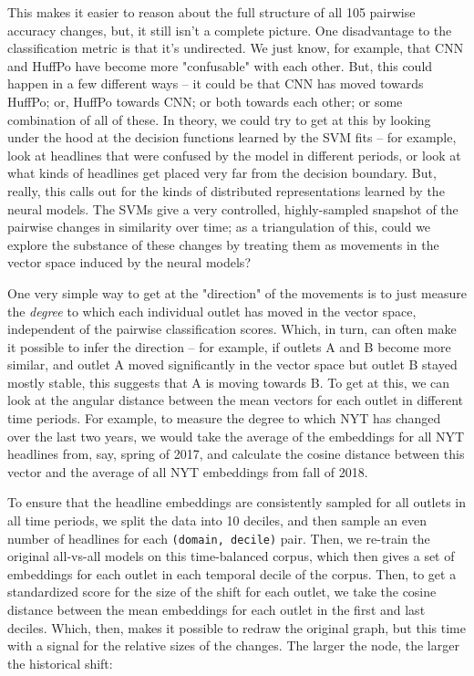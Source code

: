 \documentclass{scrartcl}
\begin{document}
This makes it easier to reason about the full structure of all 105 pairwise accuracy changes, but, it still isn't a complete picture. One disadvantage to the classification metric is that it's undirected. We just know, for example, that CNN and HuffPo have become more "confusable" with each other. But, this could happen in a few different ways -- it could be that CNN has moved towards HuffPo; or, HuffPo towards CNN; or both towards each other; or some combination of all of these. In theory, we could try to get at this by looking under the hood at the decision functions learned by the SVM fits -- for example, look at headlines that were confused by the model in different periods, or look at what kinds of headlines get placed very far from the decision boundary. But, really, this calls out for the kinds of distributed representations learned by the neural models. The SVMs give a very controlled, highly-sampled snapshot of the pairwise changes in similarity over time; as a triangulation of this, could we explore the substance of these changes by treating them as movements in the vector space induced by the neural models?

One very simple way to get at the "direction" of the movements is to just measure the \textit{degree} to which each individual outlet has moved in the vector space, independent of the pairwise classification scores. Which, in turn, can often make it possible to infer the direction -- for example, if outlets A and B become more similar, and outlet A moved significantly in the vector space but outlet B stayed mostly stable, this suggests that A is moving towards B. To get at this, we can look at the angular distance between the mean vectors for each outlet in different time periods. For example, to measure the degree to which NYT has changed over the last two years, we would take the average of the embeddings for all NYT headlines from, say, spring of 2017, and calculate the cosine distance between this vector and the average of all NYT embeddings from fall of 2018.

To ensure that the headline embeddings are consistently sampled for all outlets in all time periods, we split the data into 10 deciles, and then sample an even number of headlines for each \texttt{(domain, decile)} pair. Then, we re-train the original all-vs-all models on this time-balanced corpus, which then gives a set of embeddings for each outlet in each temporal decile of the corpus. Then, to get a standardized score for the size of the shift for each outlet, we take the cosine distance between the mean embeddings for each outlet in the first and last deciles. Which, then, makes it possible to redraw the original graph, but this time with a signal for the relative sizes of the changes. The larger the node, the larger the historical shift:
\end{document}
